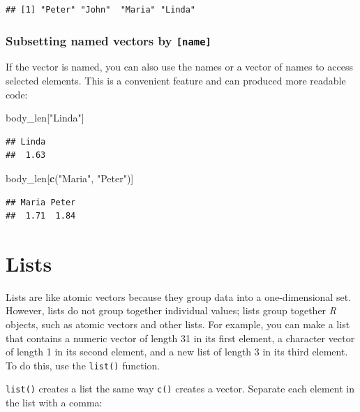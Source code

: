 \documentclass[
]{scrartcl}
\newenvironment{Shaded}{\begin{snugshade}}{\end{snugshade}}
\newcommand{\FunctionTok}[1]{\textcolor[rgb]{0.13,0.29,0.53}{\textbf{#1}}}
\newcommand{\NormalTok}[1]{#1}
\newcommand{\StringTok}[1]{\textcolor[rgb]{0.31,0.60,0.02}{#1}}
\begin{document}
\begin{verbatim}
## [1] "Peter" "John"  "Maria" "Linda"
\end{verbatim}

\subsubsection{\texorpdfstring{Subsetting named vectors by \texttt{{[}name{]}}}{Subsetting named vectors by {[}name{]}}}\label{subsetting-named-vectors-by-name}

If the vector is named, you can also use the names or a vector of names to access selected elements. This is a convenient feature and can produced more readable code:

\begin{Shaded}
\begin{Highlighting}[]
\NormalTok{body\_len[}\StringTok{"Linda"}\NormalTok{]}
\end{Highlighting}
\end{Shaded}

\begin{verbatim}
## Linda 
##  1.63
\end{verbatim}

\begin{Shaded}
\begin{Highlighting}[]
\NormalTok{body\_len[}\FunctionTok{c}\NormalTok{(}\StringTok{"Maria"}\NormalTok{, }\StringTok{"Peter"}\NormalTok{)]}
\end{Highlighting}
\end{Shaded}

\begin{verbatim}
## Maria Peter 
##  1.71  1.84
\end{verbatim}

\section{Lists}\label{lists}

Lists are like atomic vectors because they group data into a one-dimensional set. However, lists do not group together individual values; lists group together \emph{R} objects, such as atomic vectors and other lists. For example, you can make a list that contains a numeric vector of length 31 in its first element, a character vector of length 1 in its second element, and a new list of length 3 in its third element. To do this, use the \texttt{list()} function.

\texttt{list()} creates a list the same way \texttt{c()} creates a vector. Separate each element in the list with a comma:
\end{document}
